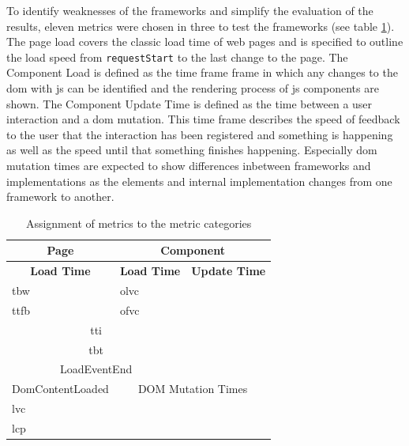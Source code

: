 \documentclass[a4paper, 12pt]{article}
\begin{document}
To identify weaknesses of the frameworks and simplify the evaluation of the results, eleven metrics were chosen in three to test the frameworks (see table \ref{tab:metriccategories}).
The page load covers the classic load time of web pages and is specified to outline the load speed from \verb|requestStart| to the last change to the page.
The Component Load is defined as the time frame frame in which any changes to the \acrshort{dom} with \acrshort{js} can be identified and the rendering process of \acrshort{js} components are shown.
The Component Update Time is defined as the time between a user interaction and a \acrshort{dom} mutation.
This time frame describes the speed of feedback to the user that the interaction has been registered and something is happening as well as the speed until that something finishes happening.
Especially \acrshort{dom} mutation times are expected to show differences inbetween frameworks and implementations as the elements and internal implementation changes from one framework to another.

\begin{table}[h]
  \begin{center}
    \begin{tabular}[h]{|l|l|l|}
      \hline
      \multicolumn{1}{|c|}{\textbf{Page}}       & \multicolumn{2}{c|}{\textbf{Component}}     \\ \hline
      \multicolumn{1}{|c|}{\textbf{Load Time}}  & \textbf{Load Time}  & \textbf{Update Time}  \\ \hline
      \acrlong{tbw}                             & \acrlong{olvc}      &                       \\ \hline
      \acrlong{ttfb}                            & \acrlong{ofvc}      &                       \\ \hline
      \multicolumn{2}{|c|}{\acrlong{tti}}                             &                       \\ \hline
      \multicolumn{2}{|c|}{\acrlong{tbt}}                             &                       \\ \hline
      \multicolumn{2}{|c|}{LoadEventEnd}                              &                       \\ \hline
      DomContentLoaded                          & \multicolumn{2}{c|}{DOM Mutation Times}     \\ \hline
      \acrlong{lvc}                             &                               &             \\ \hline
      \acrlong{lcp}                             &                               &             \\ \hline
    \end{tabular}
  \end{center}
  \caption{Assignment of metrics to the metric categories}
  \label{tab:metriccategories}
\end{table}
\end{document}
